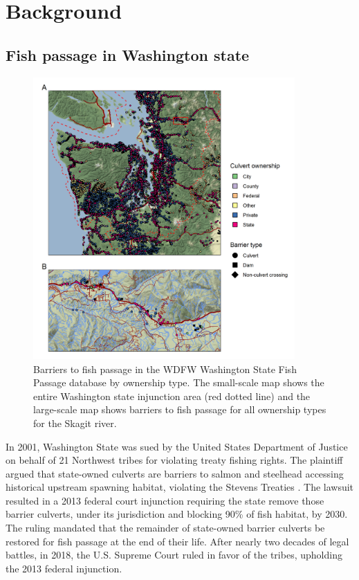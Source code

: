 \documentclass[12pt]{elsarticle}
\begin{document}
\clearpage
%
\section{Background}
\subsection{Fish passage in Washington state}


\begin{figure}
\includegraphics[width=10cm]{figures/fig_mapconcrete.png}
\caption{Barriers to fish passage in the WDFW Washington State Fish Passage database by ownership type. The small-scale map shows the entire Washington state injunction area (red dotted line) and the large-scale map shows barriers to fish passage for all ownership types for the Skagit river.\label{fig:barrierMap}}
\end{figure}%


 In 2001, Washington State was sued by the United States Department of Justice on behalf of 21 Northwest tribes for violating treaty fishing rights. The plaintiff argued that state-owned culverts are barriers to salmon and steelhead accessing historical upstream spawning habitat, violating the Stevens Treaties \citep{hickey2018highway}. The lawsuit resulted in a 2013 federal court injunction requiring the state remove those barrier culverts, under its jurisdiction and blocking 90\% of fish habitat, by 2030. The ruling mandated that the remainder of state-owned barrier culverts be restored for fish passage at the end of their life. After nearly two decades of legal battles, in 2018, the U.S. Supreme Court ruled in favor of the tribes, upholding the 2013 federal injunction. 
\end{document}
